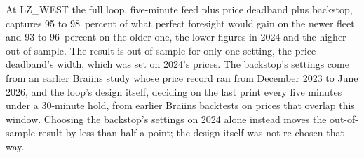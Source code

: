 At LZ\_WEST the full loop, five-minute feed plus price deadband plus backstop, captures 95 to 98~percent of what perfect foresight would gain on the newer fleet and 93 to 96~percent on the older one, the lower figures in 2024 and the higher out of sample. %
The result is out of sample for only one setting, the price deadband's width, which was set on 2024's prices. The backstop's settings come from an earlier Braiins study whose price record ran from December 2023 to June 2026, and the loop's design itself, deciding on the last print every five minutes under a 30-minute hold, from earlier Braiins backtests on prices that overlap this window. Choosing the backstop's settings on 2024 alone instead moves the out-of-sample result by less than half a point; the design itself was not re-chosen that way. %
